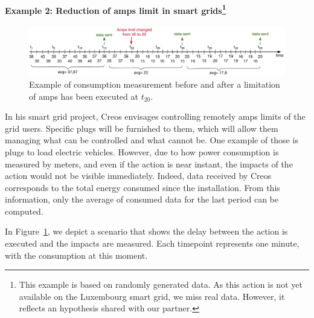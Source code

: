 \paragraph[Example 2: Reduction of amps limits in smart grids]{Example 2: Reduction of amps limit in smart grids\footnote{This example is based on randomly generated data. As this action is not yet available on the Luxembourg smart grid, we miss real data. However, it reflects an hypothesis shared with our partner.}}
\begin{figure}
	\centering
	\includegraphics[width=\linewidth]{img/chapt-tkm/intro/long-action-amps-limit}
	\caption{Example of consumption measurement before and after a limitation of amps has been executed at $t_{20}$.}
	\label{fig:tkm:intro:example-long-action-amps-limit}
\end{figure}

In his smart grid project, Creos envisages controlling remotely amps limits of the grid users.
Specific plugs will be furnished to them, which will allow them managing what can be controlled and what cannot be.
One example of those is plugs to load electric vehicles.
However, due to how power consumption is measured by meters, and even if the action is near instant, the impacts of the action would not be visible immediately.
Indeed, data received by Creos corresponds to the total energy consumed since the installation.
From this information, only the average of consumed data for the last period can be computed.

In Figure~\ref{fig:tkm:intro:example-long-action-amps-limit}, we depict a scenario that shows the delay between the action is executed and the impacts are measured.
Each timepoint represents one minute, with the consumption at this moment.

